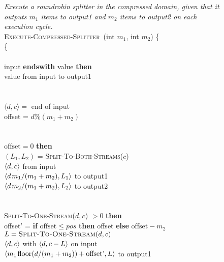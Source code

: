 \begin{figure}[t!]
\centering
\begin{minipage}{0.78\textwidth}
{\it Execute a roundrobin splitter in the compressed domain, given that
  it outputs $m_1$ items to output1 and $m_2$ items to output2 on
  each execution cycle.}\\
\textsc{Execute-Compressed-Splitter}~(int $m_1$, int $m_2$) \{\\
 \{\\
\tab{}\\
\tab{} input {\bf endswith} value {\bf then}\\
\tab\tab{} value from input to output1\\
\tab\tab\\
\tab{}\\
\tab\tab{} $\langle d,c \rangle = $ end of input\\
\tab\tab{} offset = $d\%(m_1+m_2)$\\
\tab\tab\tab\\
\tab\tab{}\\
\tab\tab{} $\mbox{offset} = 0$ {\bf then}\\ 
\tab\tab\tab{} $(L_1, L_2)$ = \textsc{Split-To-Both-Streams}($c$)\\
\tab\tab\tab{} $\langle d, c\rangle$ from input\\
\tab\tab\tab{} $\langle d{\hspace{1.3pt}}m_1/(m_1+m_2), L_1\rangle$ to output1\\
\tab\tab\tab{} $\langle d{\hspace{1.3pt}}m_2/(m_1+m_2), L_2\rangle$ to output2\\
\tab\tab\tab\\
\tab\tab{}\\
\tab\tab{} \textsc{Split-To-One-Stream}($d, c$) $> 0$ {\bf then}\\
\tab\tab\tab{} offset' = {\bf if} $\mbox{offset} \leq pos$ {\bf then} offset {\bf else} $\mbox{offset} - m_2$\\
\tab\tab\tab{} $L = \textsc{Split-To-One-Stream}(d, c)$\\
\tab\tab\tab{} $\langle d, c\rangle$ with $\langle d, c-L\rangle$ on input\\
\tab\tab\tab{} $\langle m_1{\hspace{1.3pt}}\mbox{floor}(d / (m_1 + m_2)) + \mbox{offset'},L\rangle$ to output1\\
\tab\tab\tab\\

\end{minipage}
\end{figure}
